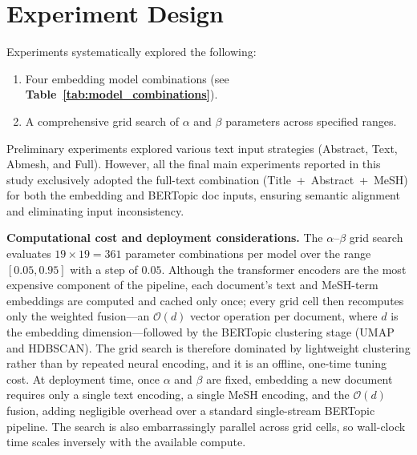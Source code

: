 \documentclass[authorproof,JACIII,researchpaper]{fujipressarticle}
\begin{document}
{\color{red}%
\section{Experiment Design}
Experiments systematically explored the following:
\begin{enumerate}[leftmargin=*,label=\arabic*)]
    \item Four embedding model combinations (see \textbf{Table~\ref{tab:model_combinations}}).
    \item A comprehensive grid search of $\alpha$ and $\beta$ parameters across specified ranges.
\end{enumerate}
}%

Preliminary experiments explored various text input strategies (Abstract, Text, Abmesh, and Full). However, all the final main experiments reported in this study exclusively adopted the full-text combination (Title~+~Abstract~+~MeSH) for both the embedding and BERTopic doc inputs, ensuring semantic alignment and eliminating input inconsistency.

{\color{red}%
\noindent\textbf{Computational cost and deployment considerations.}
The $\alpha$--$\beta$ grid search evaluates $19 \times 19 = 361$ parameter combinations per model over the range $[0.05, 0.95]$ with a step of $0.05$. Although the transformer encoders are the most expensive component of the pipeline, each document's text and MeSH-term embeddings are computed and cached only once; every grid cell then recomputes only the weighted fusion---an $\mathcal{O}(d)$ vector operation per document, where $d$ is the embedding dimension---followed by the BERTopic clustering stage (UMAP and HDBSCAN). The grid search is therefore dominated by lightweight clustering rather than by repeated neural encoding, and it is an offline, one-time tuning cost. At deployment time, once $\alpha$ and $\beta$ are fixed, embedding a new document requires only a single text encoding, a single MeSH encoding, and the $\mathcal{O}(d)$ fusion, adding negligible overhead over a standard single-stream BERTopic pipeline. The search is also embarrassingly parallel across grid cells, so wall-clock time scales inversely with the available compute.
}%
\end{document}
